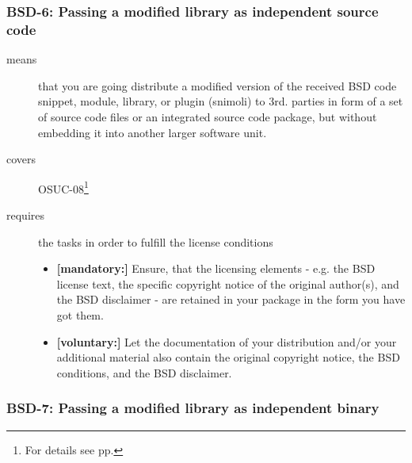 \subsubsection{BSD-6: Passing a modified library as independent source code}
\label{OSUC-08-BSD}
\begin{description}
\item[means] that you are going distribute a modified version of the received
BSD code snippet, module, library, or plugin (snimoli) to 3rd. parties in form
of a set of source code files or an integrated source code package, but without
embedding it into another larger software unit.
\item[covers] OSUC-08\footnote{For details see pp. \pageref{OSUC-08-DEF}}
\item[requires] the tasks in order to fulfill the license conditions
\begin{itemize}
  \item \textbf{[mandatory:]} Ensure, that the licensing elements - e.g.
  the BSD license text, the specific copyright notice of the original author(s),
  and the BSD disclaimer - are retained in your package in the form you have got
  them.
  \item \textbf{[voluntary:]} Let the documentation of your distribution
  and/or your additional material also contain the original copyright notice, the
  BSD conditions, and the BSD disclaimer.
\end{itemize}
\end{description}


\subsubsection{BSD-7: Passing a modified library as independent binary}

